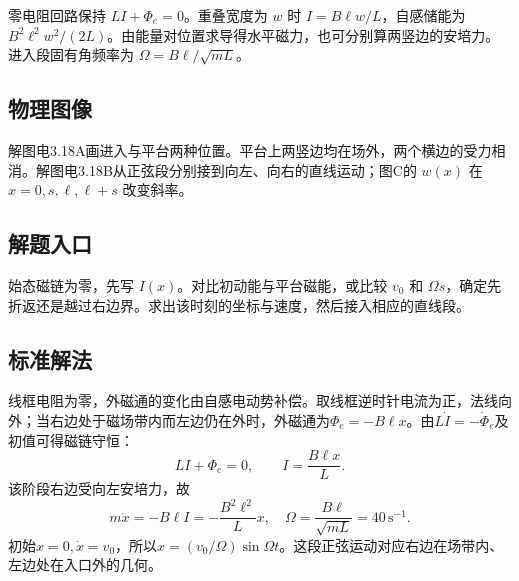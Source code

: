 \documentclass[UTF8,fontset=fandol,a4paper,11pt]{ctexart}
\begin{document}
零电阻回路保持 $LI+\Phi_e=0$。重叠宽度为 $w$ 时 $I=B\ell w/L$，自感储能为 $B^2\ell^2w^2/(2L)$。由能量对位置求导得水平磁力，也可分别算两竖边的安培力。进入段固有角频率为 $\Omega=B\ell/\sqrt{mL}$。



\subsection*{物理图像}

解图电3.18A画进入与平台两种位置。平台上两竖边均在场外，两个横边的受力相消。解图电3.18B从正弦段分别接到向左、向右的直线运动；图C的 $w(x)$ 在 $x=0,s,\ell,\ell+s$ 改变斜率。



\subsection*{解题入口}

始态磁链为零，先写 $I(x)$。对比初动能与平台磁能，或比较 $v_0$ 和 $\Omega s$，确定先折返还是越过右边界。求出该时刻的坐标与速度，然后接入相应的直线段。


\subsection*{标准解法}

线框电阻为零，外磁通的变化由自感电动势补偿。取线框逆时针电流为正，法线向外；当右边处于磁场带内而左边仍在外时，外磁通为$\Phi_e=-B\ell x$。由$L\dot I=-\dot\Phi_e$及初值可得磁链守恒：
\[
LI+\Phi_e=0,\qquad I=\frac{B\ell x}{L}.
\]
该阶段右边受向左安培力，故
\[
m\ddot x=-B\ell I=-\frac{B^2\ell^2}{L}x,
\quad \Omega=\frac{B\ell}{\sqrt{mL}}=40\,\mathrm{s^{-1}}.
\]
初始$x=0,\dot x=v_0$，所以$x=(v_0/\Omega)\sin\Omega t$。这段正弦运动对应右边在场带内、左边处在入口外的几何。
\end{document}

